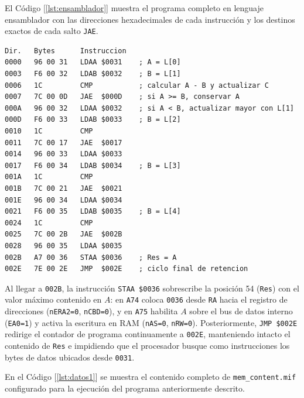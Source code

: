 \documentclass[letterpaper,12pt]{article}
\newcommand{\hx}[1]{\texttt{#1}}
\begin{document}
El Código [\ref{lst:ensamblador}] muestra el programa completo en lenguaje ensamblador con las direcciones hexadecimales de cada instrucción y los destinos exactos de cada salto \texttt{JAE}.

\begin{lstlisting}[style=asm,caption={Programa en ensamblador para obtener el mayor de cinco elementos.},label={lst:ensamblador}]
Dir.   Bytes      Instruccion
0000   96 00 31   LDAA $0031    ; A = L[0]
0003   F6 00 32   LDAB $0032    ; B = L[1]
0006   1C         CMP           ; calcular A - B y actualizar C
0007   7C 00 0D   JAE  $000D    ; si A >= B, conservar A
000A   96 00 32   LDAA $0032    ; si A < B, actualizar mayor con L[1]
000D   F6 00 33   LDAB $0033    ; B = L[2]
0010   1C         CMP
0011   7C 00 17   JAE  $0017
0014   96 00 33   LDAA $0033
0017   F6 00 34   LDAB $0034    ; B = L[3]
001A   1C         CMP
001B   7C 00 21   JAE  $0021
001E   96 00 34   LDAA $0034
0021   F6 00 35   LDAB $0035    ; B = L[4]
0024   1C         CMP
0025   7C 00 2B   JAE  $002B
0028   96 00 35   LDAA $0035
002B   A7 00 36   STAA $0036    ; Res = A
002E   7E 00 2E   JMP  $002E    ; ciclo final de retencion
\end{lstlisting}

Al llegar a \hx{002B}, la instrucción \texttt{STAA \$0036} sobrescribe la posición 54 (\texttt{Res}) con el valor máximo contenido en $A$: en \hx{A74} coloca \hx{0036} desde \texttt{RA} hacia el registro de direcciones (\texttt{nERA2=0}, \texttt{nCBD=0}), y en \hx{A75} habilita $A$ sobre el bus de datos interno (\texttt{EA0=1}) y activa la escritura en RAM (\texttt{nAS=0}, \texttt{nRW=0}). Posteriormente, \texttt{JMP \$002E} redirige el contador de programa continuamente a \hx{002E}, manteniendo intacto el contenido de \texttt{Res} e impidiendo que el procesador busque como instrucciones los bytes de datos ubicados desde \hx{0031}.

En el Código [\ref{lst:datos1}] se muestra el contenido completo de \texttt{mem\_content.mif} configurado para la ejecución del programa anteriormente descrito.
\end{document}
